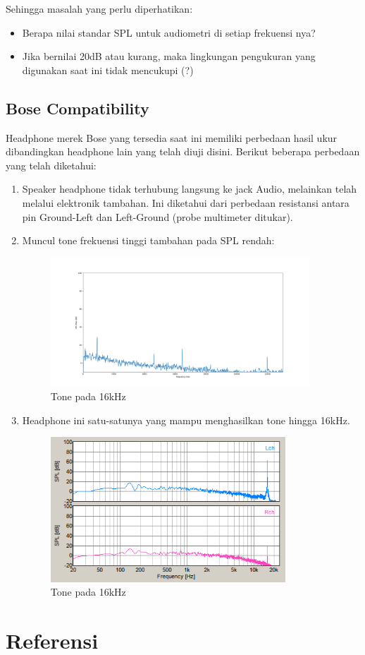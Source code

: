 \documentclass[12pt,]{article}
\begin{document}
	Sehingga masalah yang perlu diperhatikan:
	\begin{itemize}
		\item Berapa nilai standar SPL untuk audiometri di setiap frekuensi nya?
		\item Jika bernilai 20dB atau kurang, maka lingkungan pengukuran yang digunakan saat ini tidak mencukupi (?)
	\end{itemize}
	
	\subsection{Bose Compatibility}
	
	Headphone merek Bose yang tersedia saat ini memiliki perbedaan hasil ukur dibandingkan headphone lain yang telah diuji disini.
	Berikut beberapa perbedaan yang telah diketahui:
	
	\begin{enumerate}
		\item Speaker headphone tidak terhubung langsung ke jack Audio, melainkan telah melalui elektronik tambahan.
		Ini diketahui dari perbedaan resistansi antara pin Ground-Left dan Left-Ground (probe multimeter ditukar).
		
		\item Muncul tone frekuensi tinggi tambahan pada SPL rendah:
		\begin{figure}[!ht]
			\centering
			\includegraphics[width=275pt]{hasil/bose/maxallfreq/low_noise}
			\caption{Tone pada 16kHz}
		\end{figure}

		\item Headphone ini satu-satunya yang mampu menghasilkan tone hingga 16kHz.
		\begin{figure}[!ht]
			\centering
			\includegraphics[width=250pt]{hasil/bose/maxallfreq/16000}
			\caption{Tone pada 16kHz}
		\end{figure}
	\end{enumerate}
	
	\newpage
	\section{Referensi}
	\label{}
	
	
	
%		
		
\end{document}
